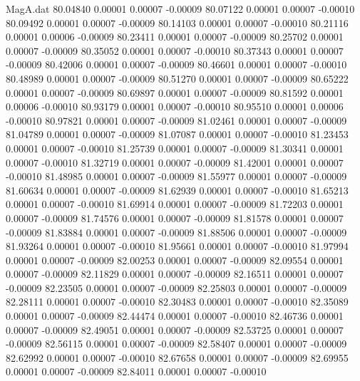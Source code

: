 \begin{filecontents}{MagA.dat}
  80.04840    0.00001    0.00007   -0.00009
  80.07122    0.00001    0.00007   -0.00010
  80.09492    0.00001    0.00007   -0.00009
  80.14103    0.00001    0.00007   -0.00010
  80.21116    0.00001    0.00006   -0.00009
  80.23411    0.00001    0.00007   -0.00009
  80.25702    0.00001    0.00007   -0.00009
  80.35052    0.00001    0.00007   -0.00010
  80.37343    0.00001    0.00007   -0.00009
  80.42006    0.00001    0.00007   -0.00009
  80.46601    0.00001    0.00007   -0.00010
  80.48989    0.00001    0.00007   -0.00009
  80.51270    0.00001    0.00007   -0.00009
  80.65222    0.00001    0.00007   -0.00009
  80.69897    0.00001    0.00007   -0.00009
  80.81592    0.00001    0.00006   -0.00010
  80.93179    0.00001    0.00007   -0.00010
  80.95510    0.00001    0.00006   -0.00010
  80.97821    0.00001    0.00007   -0.00009
  81.02461    0.00001    0.00007   -0.00009
  81.04789    0.00001    0.00007   -0.00009
  81.07087    0.00001    0.00007   -0.00010
  81.23453    0.00001    0.00007   -0.00010
  81.25739    0.00001    0.00007   -0.00009
  81.30341    0.00001    0.00007   -0.00010
  81.32719    0.00001    0.00007   -0.00009
  81.42001    0.00001    0.00007   -0.00010
  81.48985    0.00001    0.00007   -0.00009
  81.55977    0.00001    0.00007   -0.00009
  81.60634    0.00001    0.00007   -0.00009
  81.62939    0.00001    0.00007   -0.00010
  81.65213    0.00001    0.00007   -0.00010
  81.69914    0.00001    0.00007   -0.00009
  81.72203    0.00001    0.00007   -0.00009
  81.74576    0.00001    0.00007   -0.00009
  81.81578    0.00001    0.00007   -0.00009
  81.83884    0.00001    0.00007   -0.00009
  81.88506    0.00001    0.00007   -0.00009
  81.93264    0.00001    0.00007   -0.00010
  81.95661    0.00001    0.00007   -0.00010
  81.97994    0.00001    0.00007   -0.00009
  82.00253    0.00001    0.00007   -0.00009
  82.09554    0.00001    0.00007   -0.00009
  82.11829    0.00001    0.00007   -0.00009
  82.16511    0.00001    0.00007   -0.00009
  82.23505    0.00001    0.00007   -0.00009
  82.25803    0.00001    0.00007   -0.00009
  82.28111    0.00001    0.00007   -0.00010
  82.30483    0.00001    0.00007   -0.00010
  82.35089    0.00001    0.00007   -0.00009
  82.44474    0.00001    0.00007   -0.00010
  82.46736    0.00001    0.00007   -0.00009
  82.49051    0.00001    0.00007   -0.00009
  82.53725    0.00001    0.00007   -0.00009
  82.56115    0.00001    0.00007   -0.00009
  82.58407    0.00001    0.00007   -0.00009
  82.62992    0.00001    0.00007   -0.00010
  82.67658    0.00001    0.00007   -0.00009
  82.69955    0.00001    0.00007   -0.00009
  82.84011    0.00001    0.00007   -0.00010

\end{filecontents}
